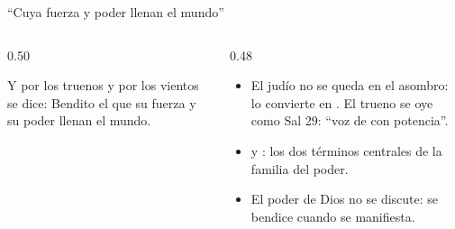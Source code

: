 \begin{frame}{``Cuya fuerza y poder llenan el mundo''}
\begin{columns}[c,onlytextwidth]
\begin{column}{0.50\textwidth}
\begin{cita}[colback=dorado!10!papiro,colframe=dorado!80!azul]Y por los truenos y por los vientos se dice: Bendito el que su fuerza y su poder llenan el mundo.\end{cita}
\begin{center}\scriptsize{}\end{center}
\end{column}
\begin{column}{0.48\textwidth}\small
\begin{itemize}
\item El judío no se queda en el asombro: lo convierte en . El trueno se oye como Sal 29: ``voz de \SENOR{} con potencia''.
\item {} y : los dos términos centrales de la familia del poder.
\item El poder de Dios no se discute: se bendice cuando se manifiesta.
\end{itemize}
\end{column}
\end{columns}
\end{frame}

